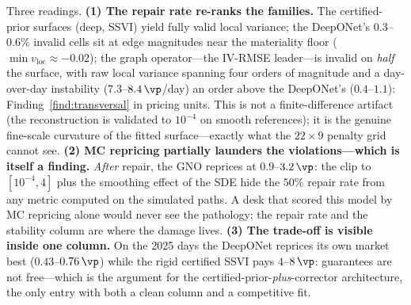 \begin{table}[htbp]\centering\small
\caption{Local-volatility validity and repricing on the real staging days (2018-01-08 for
deep/SSVI; ranges over the ten 2025-08 days for the operators and their SSVI baseline).
Repair rate = share of the grid where \eqref{eq:dupirekw} is invalid. Stability = mean
$|\Delta\sigma_{\mathrm{loc}}|$ between consecutive days (\vp). Source: Notebook 05, \S A.}
\label{tab:localvol}
\end{table}

Three readings. \textbf{(1) The repair rate re-ranks the families.} The certified-prior
surfaces (deep, SSVI) yield fully valid local variance; the DeepONet's $0.3$--$0.6\%$
invalid cells sit at edge magnitudes near the materiality floor
($\min v_{\mathrm{loc}}\approx-0.02$); the graph operator---the IV-RMSE leader---is invalid
on \emph{half} the surface, with raw local variance spanning four orders of magnitude and a
day-over-day instability ($7.3$--$8.4\,\vp$/day) an order above the DeepONet's
($0.4$--$1.1$): Finding~\ref{find:transversal} in pricing units. This is not a
finite-difference artifact (the reconstruction is validated to $10^{-4}$ on smooth
references); it is the genuine fine-scale curvature of the fitted surface---exactly what the
$22\times9$ penalty grid cannot see. \textbf{(2) MC repricing partially launders the
violations---which is itself a finding.} \emph{After} repair, the GNO reprices at
$0.9$--$3.2\,\vp$: the clip to $[10^{-4},4]$ plus the smoothing effect of the SDE hide the
$50\%$ repair rate from any metric computed on the simulated paths. A desk that scored this
model by MC repricing alone would never see the pathology; the repair rate and the stability
column are where the damage lives. \textbf{(3) The trade-off is visible inside one column.}
On the 2025 days the DeepONet reprices its own market best ($0.43$--$0.76\,\vp$) while the
rigid certified SSVI pays $4$--$8\,\vp$: guarantees are not free---which is the argument for
the certified-prior-\emph{plus}-corrector architecture, the only entry with both a clean
column and a competitive fit.

